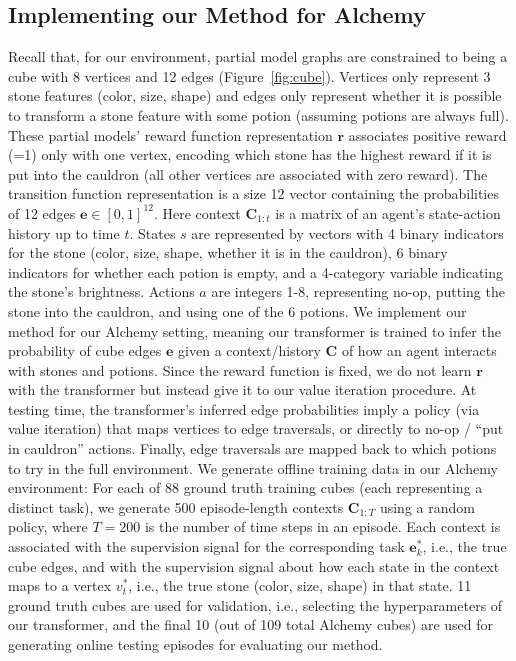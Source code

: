 \documentclass[sigconf]{aamas}
\begin{document}
\subsection{Implementing our Method for Alchemy}\label{sec:impl-method}
Recall that, for our environment, partial model graphs are constrained to being a cube with 8 vertices and 12 edges (Figure~\ref{fig:cube}). Vertices only represent 3 stone features (color, size, shape) and edges only represent whether it is possible to transform a stone feature with some potion (assuming potions are always full). These partial models' reward function representation $\mathbf{r}$ associates positive reward (=1) only with one vertex, encoding which stone has the highest reward if it is put into the cauldron (all other vertices are associated with zero reward). The transition function representation is a size 12 vector containing the probabilities of 12 edges $\mathbf{e} \in [0, 1]^{12}$.
Here context $\mathbf{C}_{1:t}$ is a matrix of an agent's state-action history up to time $t$. States $s$ are represented by vectors with 4 binary indicators for the stone (color, size, shape, whether it is in the cauldron), 6 binary indicators for whether each potion is empty, and a 4-category variable indicating the stone's brightness. Actions $a$ are integers 1-8, representing no-op, putting the stone into the cauldron, and using one of the 6 potions.
We implement our method for our Alchemy setting, meaning our transformer is trained to infer the probability of cube edges $\mathbf{e}$ given a context/history $\mathbf{C}$ of how an agent interacts with stones and potions. Since the reward function is fixed, we do not learn $\mathbf{r}$ with the transformer but instead give it to our value iteration procedure. At testing time, the transformer's inferred edge probabilities imply a policy (via value iteration) that maps vertices to edge traversals, or directly to no-op / ``put in cauldron'' actions. Finally, edge traversals are mapped back to which potions to try in the full environment.
We generate offline training data in our Alchemy environment: For each of 88 ground truth training cubes (each representing a distinct task), we generate 500 episode-length contexts $\mathbf{C}_{1:T}$ using a random policy, where $T=200$ is the number of time steps in an episode. Each context is associated with the supervision signal for the corresponding task $\mathbf{e}^*_k$, i.e., the true cube edges, and with the supervision signal about how each state in the context maps to a vertex $v_t^*$, i.e., the true stone (color, size, shape) in that state. 11 ground truth cubes are used for validation, i.e., selecting the hyperparameters of our transformer, and the final 10 (out of 109 total Alchemy cubes) are used for generating online testing episodes for evaluating our method.
\end{document}
